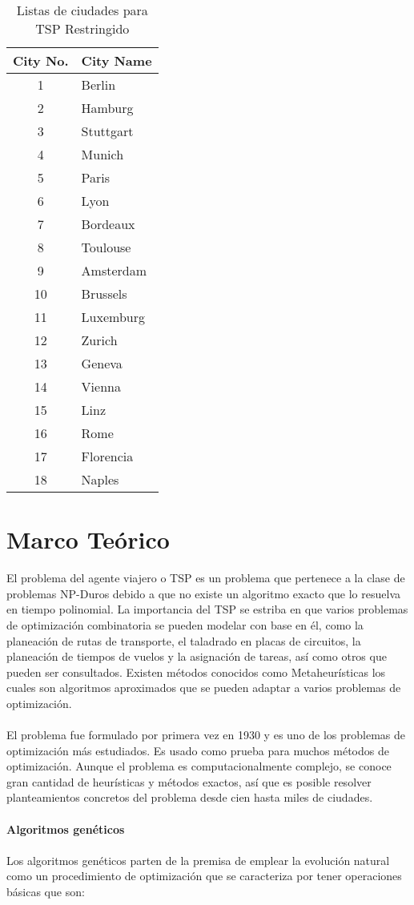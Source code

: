 \documentclass[10pt,letterpaper]{article}
\begin{document}
\begin{table}[H]
	\begin{center}
		\begin{tabular}{|c | l |}
			\hline
			City No. & City Name \\
\hline
\hline
1 & Berlin \\
\hline
2 & Hamburg \\
\hline
3 & Stuttgart \\
\hline
4 & Munich \\
\hline
5 & Paris \\
\hline
6 & Lyon \\
\hline
7 & Bordeaux \\
\hline
8 & Toulouse \\
\hline
9 & Amsterdam \\
\hline
10 & Brussels \\
\hline
11 & Luxemburg \\
\hline
12 & Zurich \\
\hline
13 & Geneva \\
\hline
14 & Vienna \\
\hline
15 & Linz \\
\hline
16 & Rome \\
\hline
17 & Florencia \\
\hline
18 & Naples \\
\hline
		\end{tabular}
		\caption{Listas de ciudades para TSP Restringido}
	\end{center}
\end{table}

\section{Marco Teórico}
El problema del agente viajero o TSP es un problema que pertenece a la clase de problemas NP-Duros debido a que no existe un algoritmo exacto que lo resuelva en tiempo polinomial. La importancia del TSP se estriba en que varios problemas de optimización combinatoria se pueden modelar con base en él, como la planeación de rutas de transporte, el taladrado en placas de circuitos, la planeación de tiempos de vuelos y la asignación de tareas, así como otros que pueden ser consultados. Existen métodos conocidos como Metaheurísticas los cuales son algoritmos aproximados que se pueden adaptar a varios problemas de optimización.
\\\\
El problema fue formulado por primera vez en 1930 y es uno de los problemas de optimización más estudiados. Es usado como prueba para muchos métodos de optimización. Aunque el problema es computacionalmente complejo, se conoce gran cantidad de heurísticas y métodos exactos, así que es posible resolver planteamientos concretos del problema desde cien hasta miles de ciudades.
\\\\
\textbf{\large Algoritmos genéticos} 
\\\\
Los algoritmos genéticos parten de la premisa de emplear la evolución natural
como un procedimiento de optimización que se caracteriza por tener operaciones básicas que son:
\end{document}
